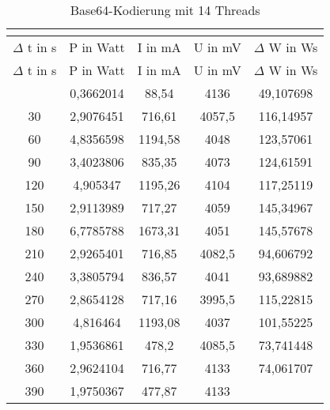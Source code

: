 
\begin{longtable}[c]{ccccc}
\caption{Base64-Kodierung mit 14 Threads} \\
\label{tab:Base64MessungThreadVierzehn}\\
\hline
{$\Delta$ t in s} & {P in Watt} & {I in mA} & {U in mV} & {$\Delta$ W in Ws} \\
\hline
\endfirsthead
\hline
$\Delta$ t in s & P in Watt & I in mA & U in mV & $\Delta$ W in Ws \\
\hline
\endhead
\hline
\endfoot
\hline
           \midrule
    0     & 0,3662014 & 88,54 & 4136  & 49,107698 \\
    \midrule
    30    & 2,9076451 & 716,61 & 4057,5 & 116,14957 \\
    \midrule
    60    & 4,8356598 & 1194,58 & 4048  & 123,57061 \\
    \midrule
    90    & 3,4023806 & 835,35 & 4073  & 124,61591 \\
    \midrule
    120   & 4,905347 & 1195,26 & 4104  & 117,25119 \\
    \midrule
    150   & 2,9113989 & 717,27 & 4059  & 145,34967 \\
    \midrule
    180   & 6,7785788 & 1673,31 & 4051  & 145,57678 \\
    \midrule
    210   & 2,9265401 & 716,85 & 4082,5 & 94,606792 \\
    \midrule
    240   & 3,3805794 & 836,57 & 4041  & 93,689882 \\
    \midrule
    270   & 2,8654128 & 717,16 & 3995,5 & 115,22815 \\
    \midrule
    300   & 4,816464 & 1193,08 & 4037  & 101,55225 \\
    \midrule
    330   & 1,9536861 & 478,2 & 4085,5 & 73,741448 \\
    \midrule
    360   & 2,9624104 & 716,77 & 4133  & 74,061707 \\
    \midrule
    390   & 1,9750367 & 477,87 & 4133  &  \\
\end{longtable}


